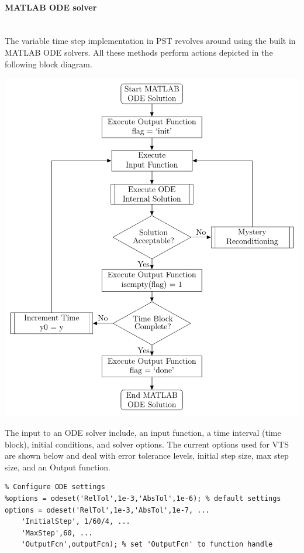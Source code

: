 \documentclass[12pt]{article}
\begin{document}
\pagebreak
\paragraph{MATLAB ODE solver} \ \\
The variable time step implementation in PST revolves around using the built in MATLAB ODE solvers.
All these methods perform actions depicted in the following block diagram.

\begin{center}
\includegraphics[width=.8\linewidth]{./../200804-ODEblockDiagram/200804-ODEblockDiagram}
\end{center}

The input to an ODE solver include, an input function, a time interval (time block), initial conditions, and solver options.
The current options used for VTS are shown below and deal with error tolerance levels, initial step size, max step size, and an Output function.

\begin{verbatim}
% Configure ODE settings
%options = odeset('RelTol',1e-3,'AbsTol',1e-6); % default settings
options = odeset('RelTol',1e-3,'AbsTol',1e-7, ...
    'InitialStep', 1/60/4, ...
    'MaxStep',60, ...
    'OutputFcn',outputFcn); % set 'OutputFcn' to function handle
\end{verbatim}
\end{document}
